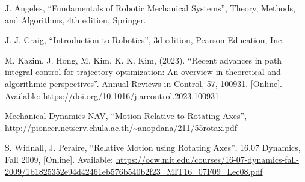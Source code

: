 \documentclass[conference]{IEEEtran}
\begin{document}
\begin{thebibliography}{00}
     J. Angeles, ``Fundamentals of Robotic Mechanical Systems'', Theory, Methods, and Algorithms, 4th edition, Springer.

     J. J. Craig, ``Introduction to Robotics'', 3d edition, Pearson Education, Inc.

     M. Kazim, J. Hong, M. Kim, K. K. Kim, (2023). ``Recent advances in path integral control for trajectory optimization: An overview in theoretical and algorithmic perspectives''. Annual Reviews in Control, 57, 100931. [Online]. Available: \url{https://doi.org/10.1016/j.arcontrol.2023.100931}

     Mechanical Dynamics NAV, ``Motion Relative to Rotating Axes'', \url{http://pioneer.netserv.chula.ac.th/~anopdana/211/55rotax.pdf}

     S. Widnall, J. Peraire, ``Relative Motion using Rotating Axes'', 16.07 Dynamics, Fall 2009, [Online]. Available: \url{https://ocw.mit.edu/courses/16-07-dynamics-fall-2009/1b1825352e94d42461eb576b540b2f23_MIT16_07F09_Lec08.pdf}
\end{thebibliography}

\vspace{30px}
\end{document}
